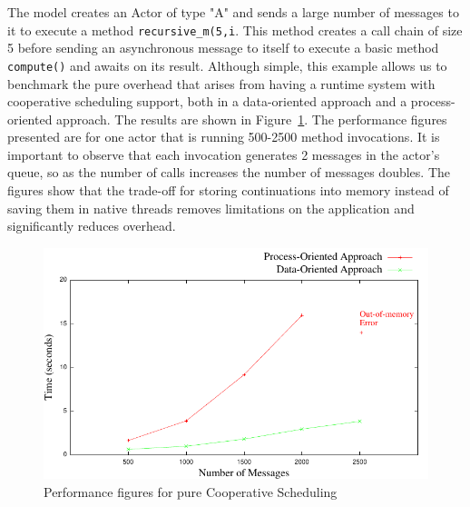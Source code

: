 \par The model creates an Actor of type "A" and sends a large number of messages to it to execute a method \lstinline|recursive_m(5,i|. This method creates a call chain of size 5 before sending an asynchronous message to itself to execute a basic method \lstinline|compute()| and awaits on its result. Although simple, this example allows us to benchmark the pure overhead that arises from having a runtime system with cooperative scheduling support, both in a data-oriented approach and a process-oriented approach. The results are shown in Figure~\ref{jj}. The performance figures presented are for one actor that is running 500-2500 method invocations. It is important to observe that each invocation generates 2 messages in the actor’s queue, so as the number of calls increases the number of messages doubles. The figures show that the trade-off for storing continuations into memory instead of saving them in native threads removes limitations on the application and significantly reduces overhead. 

\begin{figure}
	\centering
	\includegraphics[scale=.68]{jaj8.pdf}
	\caption{Performance figures for pure Cooperative Scheduling}
	\label{jj}
\end{figure}

